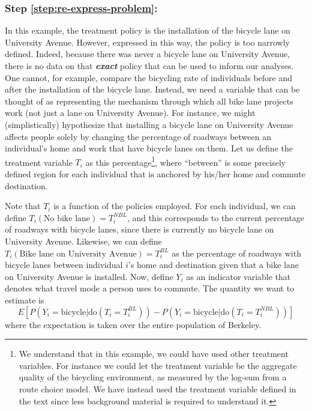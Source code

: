 \subsubsection*{Step \ref{step:re-express-problem}:}
In this example, the treatment policy is the installation of the bicycle lane on University Avenue. However, expressed in this way, the policy is too narrowly defined. Indeed, because there was never a bicycle lane on University Avenue, there is no data on that \textit{\textbf{exact}} policy that can be used to inform our analyses. One cannot, for example, compare the bicycling rate of individuals before and after the installation of the bicycle lane. Instead, we need a variable that can be thought of as representing the mechanism through which all bike lane projects work (not just a lane on University Avenue). For instance, we might (simplistically) hypothesize that installing a bicycle lane on University Avenue affects people solely by changing the percentage of roadways between an individual's home and work that have bicycle lanes on them. Let us define the treatment variable $T_i$ as this percentage\footnote{We understand that in this example, we could have used other treatment variables. For instance we could let the treatment variable be the aggregate quality of the bicycling environment, as measured by the log-sum from a route choice model. We have instead used the treatment variable defined in the text since less background material is required to understand it.}, where ``between'' is some precisely defined region for each individual that is anchored by his/her home and commute destination.

Note that $T_i$ is a function of the policies employed. For each individual, we can define $T_i \left( \textrm{No bike lane} \right) = T_i ^{NBL}$, and this corresponds to the current percentage of roadways with bicycle lanes, since there is currently no bicycle lane on University Avenue. Likewise, we can define $T_i \left( \textrm{Bike lane on University Avenue} \right) = T_i ^{BL}$ as the percentage of roadways with bicycle lanes between individual $i$'s home and destination given that a bike lane on University Avenue is installed. Now, define $Y_i$ as an indicator variable that denotes what travel mode a person uses to commute. The quantity we want to estimate is
$$E \left[ P \left( Y_i = \textrm{bicycle} | \textrm{do} \left( T_i = T_i ^{BL} \right) \right) - P \left( Y_i = \textrm{bicycle} | \textrm{do} \left( T_i = T_i ^{NBL} \right) \right) \right]$$
where the expectation is taken over the entire population of Berkeley.

